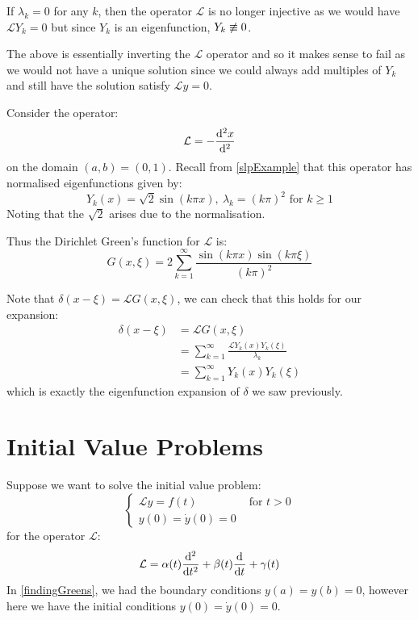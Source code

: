 \documentclass[../main.tex]{subfiles}
\begin{document}
\begin{remark}
  If $\lambda_k = 0$ for any $k$, then the operator $\mathcal{L}$ is no longer injective as we would have $\mathcal{L}Y_k = 0$ but since $Y_k$ is an eigenfunction, $Y_k \centernot\equiv 0$.

  The above is essentially inverting the $\mathcal{L}$ operator and so it makes sense to fail as we would not have a unique solution since we could always add multiples of $Y_k$ and still have the solution satisfy $\mathcal{L}y = 0$.
\end{remark}
\begin{example}
  Consider the operator:
  \[
    \mathcal{L} =  - \deriv[2]{x}{}
  \]
  on the domain $(a, b) = (0, 1)$.
  Recall from \cref{slpExample} that this operator has normalised eigenfunctions given by:
  \[
    Y_k(x) = \sqrt{2} \sin(k \pi x),\ \lambda_k = (k \pi)^2 \text{ for $k \geq 1$}
  \]
  Noting that the $\sqrt{2}$ arises due to the normalisation.

  Thus the Dirichlet Green's function for $\mathcal{L}$ is:
  \[
    G(x, \xi) =  2 \sum_{k = 1}^{\infty} \frac{\sin(k \pi x) \sin(k \pi \xi)}{(k \pi)^2}
  \]
\end{example}
Note that $\delta(x - \xi) = \mathcal{L}G(x, \xi)$, we can check that this holds for our expansion:
\begin{align*}
  \delta(x - \xi) &= \mathcal{L}G(x, \xi) \\
                  &= \sum_{k = 1}^{\infty} \frac{\mathcal{L}Y_k(x) Y_k(\xi)}{\lambda_k} \\
                  &= \sum_{k = 1}^{\infty} Y_k(x)Y_k(\xi)
\end{align*}
which is exactly the eigenfunction expansion of $\delta$ we saw previously.
\section{Initial Value Problems}
Suppose we want to solve the initial value problem:
\begin{equation}
  \label{tIVP}
  \begin{cases}
    \mathcal{L}y  = f(t) & \text{ for } t > 0\\
  y(0) = \dot{y}(0) = 0 &
  \end{cases}
\end{equation}
for the operator $\mathcal{L}$:
\[
  \mathcal{L} = \alpha(t) \deriv[2]{}{t} + \beta(t) \deriv{}{t} + \gamma(t)
\]
In \cref{findingGreens}, we had the boundary conditions $y(a) = y(b) = 0$, however here we have the initial conditions $y(0) = \dot{y}(0) = 0$.
\end{document}
